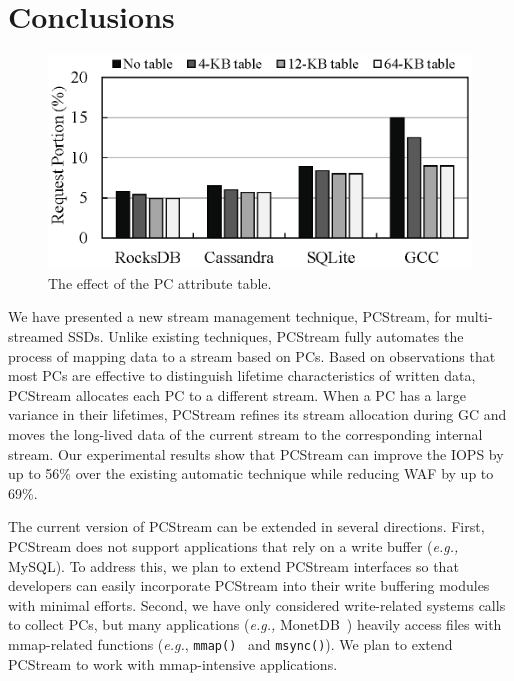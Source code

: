 \section{Conclusions}

\begin{figure}[t]
	\centering
	\includegraphics[width=0.8\linewidth]{figure/pctable}
	\caption{The effect of the PC attribute table.}
	\vspace{-5pt}
	\label{fig:pctable}
	\vspace{-10pt}
\end{figure}


We have presented a new stream management technique, \textsf{\small PCStream},
for multi-streamed SSDs.  Unlike existing techniques, \textsf{\small PCStream}
fully automates the process of mapping data to a stream based on PCs.  Based on
observations that most PCs are effective to distinguish lifetime
characteristics of written data, \textsf{\small PCStream} allocates each PC to
a different stream.  When a PC has a large variance in their lifetimes,
\textsf{\small PCStream} refines its stream allocation during GC and moves the
long-lived data of the current stream to the corresponding internal stream.
Our experimental results show that \textsf{\small PCStream} can improve the
IOPS by up to 56\% over the existing automatic technique while reducing WAF by
up to 69\%. 

The current version of \textsf{\small PCStream} can be extended in several
directions.  First, \textsf{\small PCStream} does not support applications that
rely on a write buffer ({\it e.g.,} MySQL). To address this, we plan to extend
\textsf{\small PCStream} interfaces so that developers can easily incorporate
\textsf{\small PCStream} into their write buffering modules with minimal
efforts.  Second, we have only considered write-related systems calls to
collect PCs, but many applications ({\it e.g.,} MonetDB~\cite{MonetDB}) heavily
access files with mmap-related functions ({\it e.g.}, \texttt{mmap()}~\cite{mmap} and
\texttt{msync()}).  We plan to extend \textsf{\small PCStream} to work with
mmap-intensive applications. 


